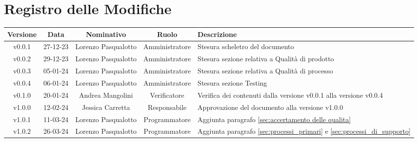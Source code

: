 \section*{\Large Registro delle Modifiche}
    \begin{table}[h]
        \centering
        \renewcommand\tabularxcolumn[1]{m{#1}} %
        \renewcommand{\arraystretch}{1.5}
        \begin{tabularx}{0.98\textwidth}
            {c|c|c|c|>{\centering\arraybackslash}X}
            \rowcolor{black}
            \textbf{\color{white} Versione} & \textbf{\color{white} Data} & \textbf{\color{white} Nominativo} & \textbf{\color{white} Ruolo} & \textbf{\color{white} Descrizione} \\ 
            \hline

            v0.0.1 & 27-12-23 & Lorenzo Pasqualotto & Amministratore & Stesura scheletro del documento \\

            v0.0.2 & 29-12-23 & Lorenzo Pasqualotto & Amministratore & Stesura sezione relativa a Qualità di prodotto\\

            v0.0.3 & 05-01-24 & Lorenzo Pasqualotto & Amministratore & Stesura sezione relativa a Qualità di processo\\

            v0.0.4 & 06-01-24 & Lorenzo Pasqualotto & Amministratore & Stesura sezione Testing\\

            v0.1.0 & 20-01-24 & Andrea Mangolini & Verificatore & Verifica dei contenuti dalla versione v0.0.1 alla versione v0.0.4\\

            v1.0.0 & 12-02-24 & Jessica Carretta & Responsabile & Approvazione del documento alla versione v1.0.0\\

            v1.0.1 & 11-03-24 & Lorenzo Pasqualotto & Programmatore & Aggiunta paragrafo \ref{sec:accertamento delle qualita}\\

            v1.0.2 & 26-03-24 & Lorenzo Pasqualotto & Programmatore & Aggiunta paragrafo \ref{sec:processi_primari} e \ref{sec:processi_di_supporto}\\
            \hline
        \end{tabularx}
    \end{table}